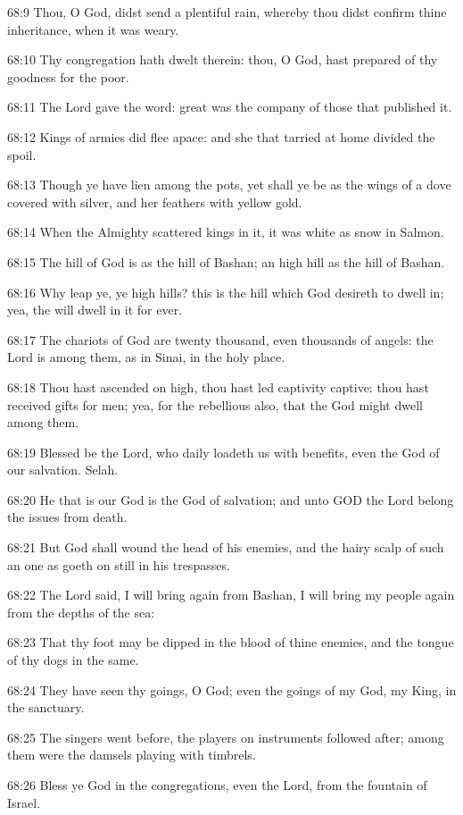 68:9 Thou, O God, didst send a plentiful rain, whereby thou didst
confirm thine inheritance, when it was weary.

68:10 Thy congregation hath dwelt therein: thou, O God, hast prepared
of thy goodness for the poor.

68:11 The Lord gave the word: great was the company of those that
published it.

68:12 Kings of armies did flee apace: and she that tarried at home
divided the spoil.

68:13 Though ye have lien among the pots, yet shall ye be as the wings
of a dove covered with silver, and her feathers with yellow gold.

68:14 When the Almighty scattered kings in it, it was white as snow in
Salmon.

68:15 The hill of God is as the hill of Bashan; an high hill as the
hill of Bashan.

68:16 Why leap ye, ye high hills? this is the hill which God desireth
to dwell in; yea, the \LORD will dwell in it for ever.

68:17 The chariots of God are twenty thousand, even thousands of
angels: the Lord is among them, as in Sinai, in the holy place.

68:18 Thou hast ascended on high, thou hast led captivity captive:
thou hast received gifts for men; yea, for the rebellious also, that
the \LORD God might dwell among them.

68:19 Blessed be the Lord, who daily loadeth us with benefits, even
the God of our salvation. Selah.

68:20 He that is our God is the God of salvation; and unto GOD the
Lord belong the issues from death.

68:21 But God shall wound the head of his enemies, and the hairy scalp
of such an one as goeth on still in his trespasses.

68:22 The Lord said, I will bring again from Bashan, I will bring my
people again from the depths of the sea:

68:23 That thy foot may be dipped in the blood of thine enemies, and
the tongue of thy dogs in the same.

68:24 They have seen thy goings, O God; even the goings of my God, my
King, in the sanctuary.

68:25 The singers went before, the players on instruments followed
after; among them were the damsels playing with timbrels.

68:26 Bless ye God in the congregations, even the Lord, from the
fountain of Israel.

